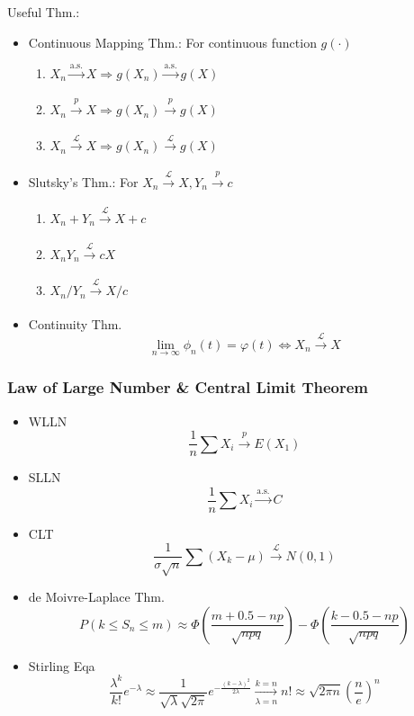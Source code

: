 \documentclass[11pt,a4paper]{ctexart}
\numberwithin{equation}{section}%
\begin{document}
        Useful Thm.:
        \begin{itemize}
            \item Continuous Mapping Thm.: For continuous function $g(\cdot)$
            \begin{enumerate}
                \item $X_n\xrightarrow[]{\text{a.s.}}X\Rightarrow g(X_n)\xrightarrow[]{\text{a.s.}}g(X)$
                \item $X_n\xrightarrow[]{p}X\Rightarrow g(X_n)\xrightarrow[]{p}g(X)$
                \item $X_n\xrightarrow[]{\mathscr{L}}X\Rightarrow g(X_n)\xrightarrow[]{\mathscr{L}}g(X)$
            \end{enumerate}
            \item Slutsky's Thm.: For $X_n\xrightarrow[]{\mathscr{L}}X,Y_n\xrightarrow[]{p}c$
            \begin{enumerate}
                \item $X_n+Y_n\xrightarrow[]{\mathscr{L}}X+c$
                \item $X_nY_n\xrightarrow[]{\mathscr{L}}cX$
                \item $X_n/Y_n\xrightarrow[]{\mathscr{L}}X/c$
            \end{enumerate}
            \item Continuity Thm.
            \[\lim_{n\to\infty}\phi_n(t)=\varphi(t)\Leftrightarrow X_n\xrightarrow[]{\mathscr{L}}X\]
        \end{itemize} 


\subsubsection{Law of Large Number \& Central Limit Theorem}

\begin{itemize}
    \item WLLN
\[
    \frac{1}{n}\sum X_i\xrightarrow[]{p} E(X_1)
\]
\item SLLN
\[
    \frac{1}{n}\sum X_i\xrightarrow[]{\text{a.s.}}  C
\]
\item CLT
\[
    \frac{1}{\sigma\sqrt{n}}\sum(X_k-\mu)\xrightarrow[]{\mathscr{L}} N(0,1)
\]
\item de Moivre-Laplace Thm.
\[
    P(k\leq S_n\leq m)\approx \Phi(\frac{m+0.5-np}{\sqrt{npq}})-\Phi(\frac{k-0.5-np}{\sqrt{npq}})
\]
\item Stirling Eqa
\[
    \frac{\lambda^k}{k!}e^{-\lambda}\approx \frac{1}{\sqrt{\lambda}\sqrt{2\pi}}e^{-\frac{(k-\lambda)^2}{2\lambda}}\xrightarrow[\lambda=n]{k=n}n!\approx\sqrt{2\pi n}(\frac{n}{e})^n
\]

\end{itemize}
\end{document}
